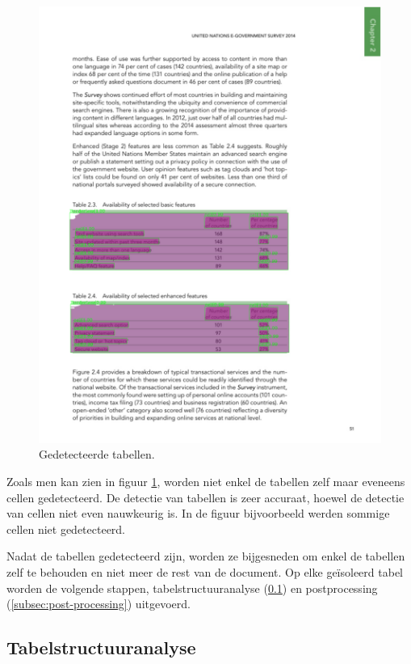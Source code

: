 \begin{figure}[H]
\begin{minipage}{0.5\textwidth}
        \centering
        \includegraphics[width=1\textwidth]{img/tabel_detectie_voorbeeld_gedetecteerd.png}
        \caption{Gedetecteerde tabellen.}
        \label{fig:tabel-detectie-gedetecteerd}
    \end{minipage}
\end{figure}

Zoals men kan zien in figuur \ref{fig:tabel-detectie-gedetecteerd}, worden niet enkel de tabellen zelf maar eveneens cellen gedetecteerd. De detectie van tabellen is zeer accuraat, hoewel de detectie van cellen niet even nauwkeurig is. In de figuur bijvoorbeeld werden sommige cellen niet gedetecteerd.

Nadat de tabellen gedetecteerd zijn, worden ze bijgesneden om enkel de tabellen zelf te behouden en niet meer de rest van de document. Op elke geïsoleerd tabel worden de volgende stappen, tabelstructuuranalyse (\ref{subsec:tabel-structuur-analyse}) en postprocessing (\ref{subsec:post-processing}) uitgevoerd.

\subsection{Tabelstructuuranalyse}
\label{subsec:tabel-structuur-analyse}

